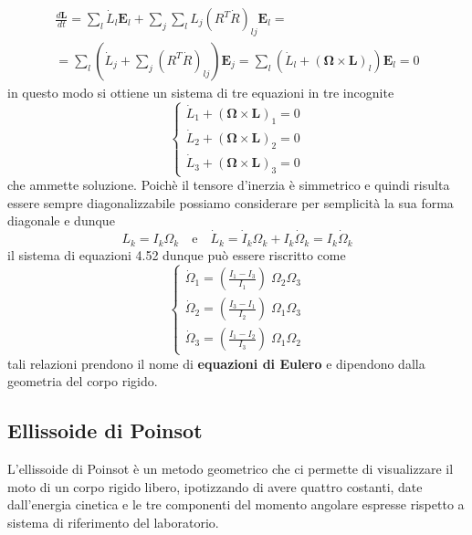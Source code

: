 \begin{equation}
	\begin{aligned}
		& \frac{d \bm{L}}{dt} = \sum_{l} \dot{L}_{l}\bm{E}_{l} + \sum_{j}\sum_{l} L_{j} \left (R^T \dot{R} \right )_{lj} \bm{E}_{l} = & \\[0.1in]
		& = \sum_{l} \left ( \dot{L}_{j} + \sum_{j}\left (R^T \dot{R} \right )_{lj} \right ) \bm{E}_{j} = \sum_{l} \left ( \dot{L}_{l} + \left ( \bm{\Omega} \times \bm{L} \right )_{l} \right )\bm{E}_{l} = 0
	\end{aligned}
\end{equation}
in questo modo si ottiene un sistema di tre equazioni in tre incognite 
\begin{equation}
	\left \{ \begin{array}{l}
		\dot{L}_{1} + \left ( \bm{\Omega} \times \bm{L} \right )_{1} = 0 \\[0.1in]
		\dot{L}_{2} + \left ( \bm{\Omega} \times \bm{L} \right )_{2} = 0\\[0.1in]
		\dot{L}_{3} + \left ( \bm{\Omega} \times \bm{L} \right )_{3} = 0
	\end{array} \right.
\end{equation}
che ammette soluzione. Poich\`{e} il tensore d'inerzia \`{e} simmetrico e quindi risulta essere sempre diagonalizzabile possiamo considerare per semplicit\`{a} la sua forma diagonale e dunque
\begin{equation}
	L_{k} = I_k \Omega_k \quad \text{e} \quad \dot{L}_{k} = \dot{I}_{k} \Omega_{k}  + I_k \dot{\Omega}_k = I_k \dot{\Omega}_k
\end{equation}
il sistema di equazioni 4.52 dunque pu\`{o} essere riscritto come 
\begin{equation}
	\left \{ \begin{array}{l}
		\dot{\Omega}_{1} = \left ( \frac{I_1 - I_3}{I_1} \right ) \;\Omega_2 \Omega_3  \\[0.1in]
		\dot{\Omega}_{2} = \left ( \frac{I_3 - I_1}{I_2} \right ) \;\Omega_1 \Omega_3 \\[0.1in]
		\dot{\Omega}_{3} = \left ( \frac{I_1 - I_2}{I_3} \right ) \;\Omega_1 \Omega_2
	\end{array} \right.
\end{equation}
tali relazioni prendono il nome di \textbf{equazioni di Eulero}  e dipendono dalla geometria del corpo rigido.	
\subsection{Ellissoide di Poinsot}
L'ellissoide di Poinsot \`{e} un metodo geometrico che ci permette di visualizzare il moto di un corpo rigido libero, ipotizzando di avere quattro costanti, date dall'energia cinetica e le tre componenti del momento angolare espresse rispetto a sistema di riferimento del laboratorio.



